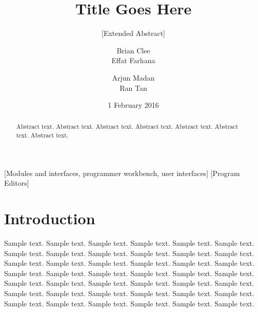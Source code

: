 \documentclass{acm_proc_article-sp}
\begin{document}
\title{Title Goes Here}
\subtitle{[Extended Abstract]}

\author{
\alignauthor
Brian Clee\\
\alignauthor
Effat Farhana\\
\and %
\alignauthor
Arjun Madan\\
\alignauthor
Ran Tan\\
}

\date{1 February 2016}


\maketitle
\begin{abstract}
Abstract text. Abstract text. Abstract text. Abstract text. Abstract text. Abstract text. Abstract text. 
\end{abstract}

[Modules and interfaces, programmer workbench, user interfaces]
[Program Editors]



\section{Introduction}
Sample text. Sample text. Sample text. Sample text. Sample text. Sample text. 
Sample text. Sample text. Sample text. Sample text. Sample text. Sample text. 
Sample text. Sample text. Sample text. Sample text. Sample text. Sample text. 
Sample text. Sample text. Sample text. Sample text. Sample text. Sample text. 
Sample text. Sample text. Sample text. Sample text. Sample text. Sample text. 
Sample text. Sample text. Sample text. Sample text. Sample text. Sample text. 
Sample text. Sample text. Sample text. Sample text. Sample text. Sample text. 
\end{document}
